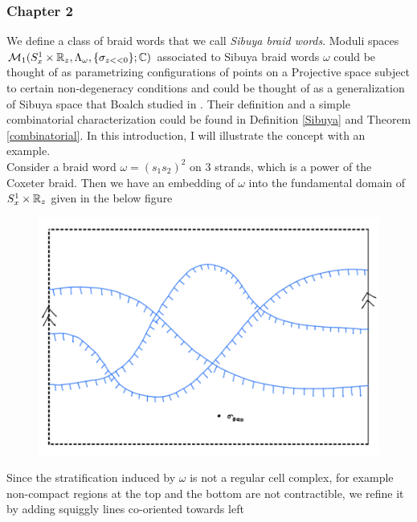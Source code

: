 \subsubsection*{Chapter 2}

We define a class of braid words that we call \emph{Sibuya braid words}. Moduli spaces $\mathcal{M}_1(S^1_x \times \mathbb{R}_z, \Lambda_\omega, \{\sigma_{z<<0}\};\mathbb{C})$ associated to Sibuya braid words $\omega$ could be thought of as parametrizing configurations of points on a Projective space subject to certain non-degeneracy conditions and could be thought of as a generalization of Sibuya space that Boalch studied in \cite{sibuya1975global}\cite{boalch2015wild}. Their definition and a simple combinatorial characterization could be found in  Definition \ref{Sibuya} and Theorem \ref{combinatorial}. In this introduction, I will illustrate the concept with an example.\\ 
Consider a braid word $\omega =(s_1 s_2)^2$ on $3$ strands, which is a power of the Coxeter braid. Then we have an embedding of $\omega$ into the fundamental domain of $S^1_x\times \mathbb{R}_z$ given in the below figure
\begin{figure}[H] 
    \centering
    \includegraphics[scale = 0.55]{diagrams/intro/7.png}
    \caption{}
    \label{fig:your-label}
\end{figure}
Since the stratification induced by $\omega$ is not a regular cell complex, for example non-compact regions at the top and the bottom are not contractible, we refine it by adding squiggly lines co-oriented towards left
